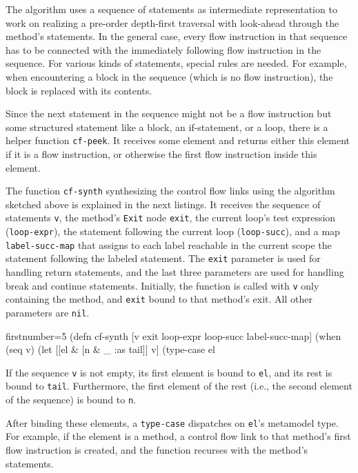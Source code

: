 \documentclass[submission]{eptcs}
\begin{document}
The algorithm uses a sequence of statements as intermediate representation to
work on realizing a pre-order depth-first traversal with look-ahead through the
method's statements.  In the general case, every flow instruction in that
sequence has to be connected with the immediately following flow instruction in
the sequence.  For various kinds of statements, special rules are needed.  For
example, when encountering a block in the sequence (which is no flow
instruction), the block is replaced with its contents.

Since the next statement in the sequence might not be a flow instruction but
some structured statement like a block, an if-statement, or a loop, there is a
helper function \verb|cf-peek|.  It receives some element and returns either
this element if it is a flow instruction, or otherwise the first flow
instruction inside this element.

The function \verb|cf-synth| synthesizing the control flow links using the
algorithm sketched above is explained in the next listings.  It receives the
sequence of statements \verb|v|, the method's \verb|Exit| node \verb|exit|, the
current loop's test expression (\verb|loop-expr|), the statement following the
current loop (\verb|loop-succ|), and a map \verb|label-succ-map| that assigns
to each label reachable in the current scope the statement following the
labeled statement.  The \verb|exit| parameter is used for handling return
statements, and the last three parameters are used for handling break and
continue statements.  Initially, the function is called with \verb|v| only
containing the method, and \verb|exit| bound to that method's exit.  All other
parameters are \verb|nil|.

\begin{clojurecode*}{firstnumber=5}
(defn cf-synth [v exit loop-expr loop-succ label-succ-map]
  (when (seq v)
    (let [[el & [n & _ :as tail]] v]
      (type-case el
\end{clojurecode*}

If the sequence \verb|v| is not empty, its first element is bound to \verb|el|,
and its rest is bound to \verb|tail|.  Furthermore, the first element of the
rest (i.e., the second element of the sequence) is bound to \verb|n|.

After binding these elements, a \verb|type-case| dispatches on \verb|el|'s
metamodel type.  For example, if the element is a method, a control flow link
to that method's first flow instruction is created, and the function recurses
with the method's statements.
\end{document}
